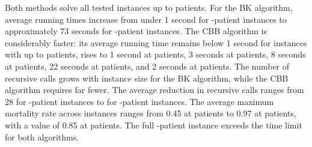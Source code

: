 Both methods solve all tested instances up to 
patients. For the BK algorithm, average running times increase from
under 1 second for -patient instances to approximately
73 seconds for -patient instances. The CBB algorithm
is considerably faster: its average running time remains below 1
second for instances with up to  patients, rises to 1
second at  patients, 3 seconds at 
patients, 8 seconds at  patients, 22 seconds at
 patients, and 2 seconds at  patients.
The number of recursive calls grows with instance size for the BK
algorithm, while the CBB algorithm requires far fewer. The average
reduction in recursive calls ranges from 28 for -patient
instances to  for -patient instances.
The average maximum mortality rate across instances ranges from 0.45
at  patients to 0.97 at  patients,
with a value of 0.85 at  patients. The full
-patient instance exceeds the time limit for both
algorithms.  
\begin{table}[htpb]
\centering
{}
\caption{\label{tab.SBKCBB} Comparing Modified Bron--Kerbosch and CBB Algorithms}
\end{table}

